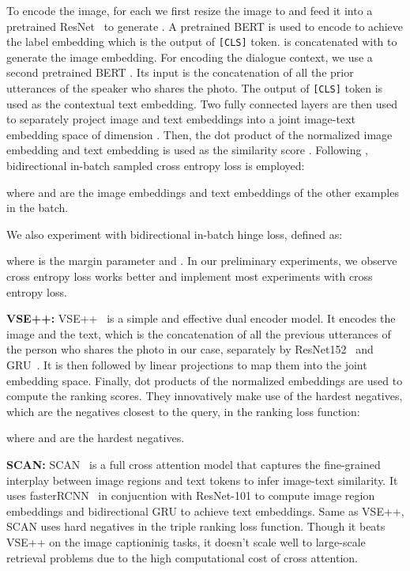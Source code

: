 \documentclass[11pt,a4paper]{article}
\begin{document}
To encode the image, for each  we first resize the image  to  and feed it into a pretrained ResNet~\cite{he2016deep} to generate . A pretrained BERT is used to encode  to achieve the label embedding  which is the output of \texttt{[CLS]} token.  is concatenated with  to generate the image embedding.
For encoding the dialogue context, we use a second pretrained BERT \cite{devlin2018bert}. Its input is the concatenation of all the prior utterances of the speaker who shares the photo. The output of \texttt{[CLS]} token is used as the contextual text embedding. 
 Two fully connected layers are then used to separately project image and text embeddings into a joint image-text embedding space of dimension . Then, the dot product of the normalized image embedding  and text embedding  is used as the similarity score . Following \citet{young-etal-2014-image, gillick2018endtoend}, bidirectional in-batch sampled cross entropy loss is employed:

where  and  are the image embeddings and text embeddings of the other examples in the batch.

We also experiment with bidirectional in-batch hinge loss, defined as:
 
where  is the margin parameter and  . In our preliminary experiments, we observe
cross entropy loss works better and implement most experiments with cross entropy loss.

\textbf{VSE++:} VSE++~\cite{faghri2018vse++} is a simple and effective dual encoder model. It encodes the image and the text, which is the concatenation of all the previous utterances of the person who shares the photo in our case, separately by ResNet152~\cite{he2016resnet} and GRU~\cite{cho2014learning}. It is then followed by linear projections to map them into the joint embedding space. Finally, dot products of the normalized embeddings are used to compute the ranking scores. They innovatively make use of the hardest negatives, which are the negatives closest to the query, in the ranking loss function:

where  and  are the hardest negatives.


\textbf{SCAN:} SCAN~\cite{lee2018stacked} is a full cross attention model that captures the fine-grained interplay between image regions and text tokens to infer image-text similarity. 
It uses fasterRCNN~\cite{ren2017fastrcnn} in conjucntion with ResNet-101 to compute image region embeddings and bidirectional GRU to achieve text embeddings. Same as VSE++, SCAN uses hard negatives in the triple ranking loss function. Though it beats VSE++ on the image captioninig tasks, it doesn't scale well to large-scale retrieval problems due to the high computational cost of cross attention.
\end{document}
